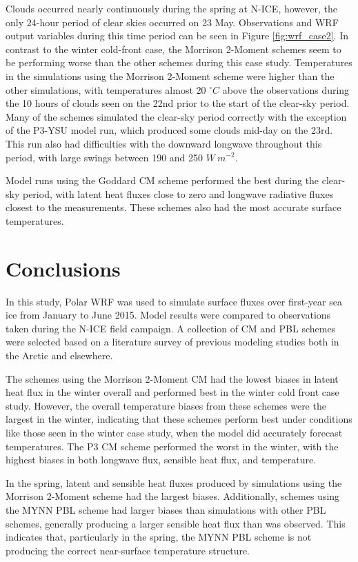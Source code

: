 Clouds occurred nearly continuously during the spring at N-ICE, however, the only 24-hour period of clear skies occurred on 23 May. Observations and WRF output variables during this time period can be seen in Figure \ref{fig:wrf_case2}. In contrast to the winter cold-front case, the Morrison 2-Moment schemes seem to be performing worse than the other schemes during this case study. Temperatures in the simulations using the Morrison 2-Moment scheme were higher than the other simulations, with temperatures almost 20 $^{\circ} C$ above the observations during the 10 hours of clouds seen on the 22nd prior to the start of the clear-sky period. Many of the schemes simulated the clear-sky period correctly with the exception of the P3-YSU model run, which produced some clouds mid-day on the 23rd. This run also had difficulties with the downward longwave throughout this period, with large swings between 190 and 250 $W~m^{-2}$. 

Model runs using the Goddard CM scheme performed the best during the clear-sky period, with latent heat fluxes close to zero and longwave radiative fluxes closest to the measurements. These schemes also had the most accurate surface temperatures.

\section{Conclusions}
In this study, Polar WRF was used to simulate surface fluxes over first-year sea ice from January to June 2015. Model results were compared to observations taken during the N-ICE field campaign. A collection of CM and PBL schemes were selected based on a literature survey of previous modeling studies both in the Arctic and elsewhere. 

The schemes using the Morrison 2-Moment CM had the lowest biases in latent heat flux in the winter overall and performed best in the winter cold front case study. However, the overall temperature biases from these schemes were the largest in the winter, indicating that these schemes perform best under conditions like those seen in the winter case study, when the model did accurately forecast temperatures. The P3 CM scheme performed the worst in the winter, with the highest biases in both longwave flux, sensible heat flux, and temperature. 

In the spring, latent and sensible heat fluxes produced by simulations using the Morrison 2-Moment scheme had the largest biases. Additionally, schemes using the MYNN PBL scheme had larger biases than simulations with other PBL schemes, generally producing a larger sensible heat flux than was observed. This indicates that, particularly in the spring, the MYNN PBL scheme is not producing the correct near-surface temperature structure. 

